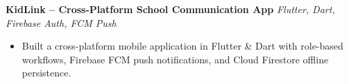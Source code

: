 \documentclass[10pt, letterpaper]{article}
\begin{document}
\vspace{3pt}

\textbf{KidLink -- Cross-Platform School Communication App} \hfill \textit{Flutter, Dart, Firebase Auth, FCM Push}
\begin{itemize}
  \item Built a cross-platform mobile application in Flutter \& Dart with role-based workflows, Firebase FCM push notifications, and Cloud Firestore offline persistence.
\end{itemize}
\end{document}
